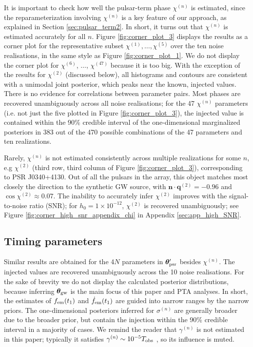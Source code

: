 \documentclass[fleqn,usenatbib,useAMS]{mnras}
\begin{document}
 It is important to check how well the pulsar-term phase $\chi^{(n)}$ is estimated, since the reparameterization involving $\chi^{(n)}$ is a key feature of our approach, as explained in Section \ref{sec:pulsar_term2}. In short, it turns out that $\chi^{(n)}$ is estimated accurately for all $n$. Figure \ref{fig:corner_plot_3} displays the results as a corner plot for the representative subset $\chi^{(1)}, \dots, \chi^{(5)}$ over the ten noise realisations, in the same style as Figure \ref{fig:corner_plot_1}. We do not display the corner plot for $\chi^{(6)}$, $\dots$, $\chi^{(47)}$ because it is too big. With the exception of the results for $\chi^{(2)}$ (discussed below), all histograms and contours are consistent with a unimodal joint posterior, which peaks near the known, injected values. There is no evidence for correlations between parameter pairs. Most phases are recovered unambiguously across all noise realisations; for the 47 $\chi^{(n)}$ parameters (i.e. not just the five plotted in Figure \ref{fig:corner_plot_3}), the injected value is  contained within the 90\% credible interval of the one-dimensional marginalized posteriors in 383 out of the 470 possible combinations of the 47 parameters and ten realizations. \newline 

Rarely, $\chi^{(n)}$ is not estimated consistently across multiple realizations for some $n$, e.g $\chi^{(2)}$ (third row, third column of Figure \ref{fig:corner_plot_3}), corresponding to PSR J0340+4130. Out of all the pulsars in the array, this object matches most closely the direction to the synthetic GW source, with $\boldsymbol{n} \cdot \boldsymbol{q}^{(2)} = -0.96$ and $\cos \chi^{(2)} \approx 0.07$. The inability to accurately infer $\chi^{(2)}$ improves with the signal-to-noise ratio (SNR); for $h_0 = 1 \times 10^{-12}$, $\chi^{(2)}$ is recovered unambiguously; see Figure \ref{fig:corner_high_snr_appendix_chi} in Appendix \ref{sec:app_high_SNR}. \newline 


\subsection{Timing parameters} \label{sec:timing_parameters}
Similar results are obtained for the 4$N$ parameters in $\boldsymbol{\theta}_{\rm psr}'$ besides $\chi^{(n)}$. The injected values are recovered unambiguously across the 10 noise realisations. For the sake of brevity we do not display the calculated posterior distributions, because inferring $\boldsymbol{\theta}_{\rm gw}$ is the main focus of this paper and PTA analyses. In short, the estimates of $f_{\rm em}(t_1)$ and $\dot{f}_{\rm em}(t_1)$ are guided into narrow ranges by the narrow priors. The one-dimensional posteriors inferred for $\sigma^{(n)}$ are generally broader due to the broader prior, but contain the injection within the  90\% credible interval in a majority of cases. We remind the reader that $\gamma^{(n)}$ is not estimated in this paper; typically it satisfies $\gamma^{(n)} \sim 10^{-5} T_{\rm obs}$ \citep{Price2012,Myers2021MNRAS.502.3113M,Meyers2021,Vargas}, so its influence is muted. \newline 
\end{document}

